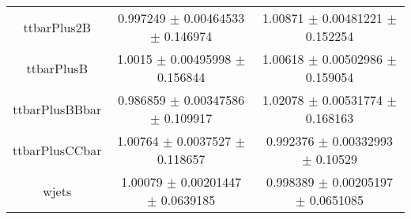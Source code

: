 \begin{table}
\begin{tabular}{ccc}
ttbarPlus2B & \num{0.997249} $\pm$ \num{0.00464533} $\pm$ \num{0.146974} & \num{1.00871} $\pm$ \num{0.00481221} $\pm$ \num{0.152254}\\
ttbarPlusB & \num{1.0015} $\pm$ \num{0.00495998} $\pm$ \num{0.156844} & \num{1.00618} $\pm$ \num{0.00502986} $\pm$ \num{0.159054}\\
ttbarPlusBBbar & \num{0.986859} $\pm$ \num{0.00347586} $\pm$ \num{0.109917} & \num{1.02078} $\pm$ \num{0.00531774} $\pm$ \num{0.168163}\\
ttbarPlusCCbar & \num{1.00764} $\pm$ \num{0.0037527} $\pm$ \num{0.118657} & \num{0.992376} $\pm$ \num{0.00332993} $\pm$ \num{0.10529}\\
wjets & \num{1.00079} $\pm$ \num{0.00201447} $\pm$ \num{0.0639185} & \num{0.998389} $\pm$ \num{0.00205197} $\pm$ \num{0.0651085}\\
\bottomrule
\end{tabular}
\end{table}